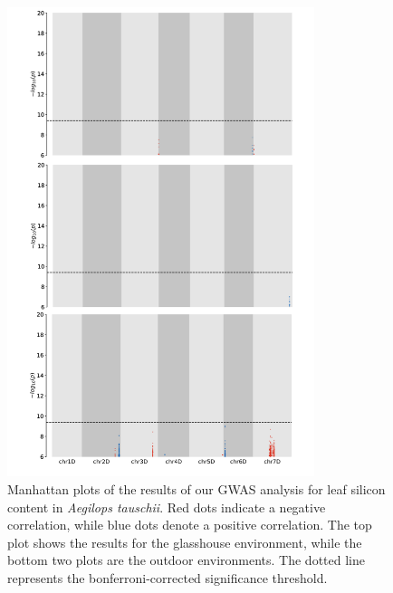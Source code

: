 \documentclass[12pt, letterpaper]{report}
\begin{document}
\begin{figure}[h]
        \centering
        \includegraphics[width=0.8\textwidth]{images/gwas_plots/svgtopng/si_manhattan_plots.png}
        \caption{Manhattan plots of the results of our GWAS analysis for leaf silicon content in \textit{Aegilops tauschii}. Red dots indicate a negative correlation, while blue dots denote a positive correlation. The top plot shows the results for the glasshouse environment, while the bottom two plots are the outdoor environments. The dotted line represents the bonferroni-corrected significance threshold.}
        \label{Fig:si_peak_plot}
\end{figure}
\end{document}
